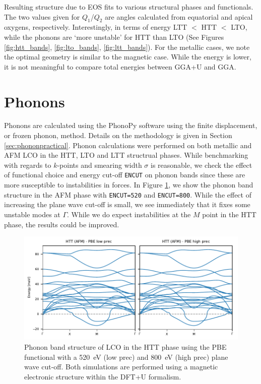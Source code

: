 \begin{table}
	\centering
	\caption[Simulation Structure Results]{Resulting structure due to EOS fits to various structural phases and functionals. The two values given for $Q_1$/$Q_2$ are angles calculated from equatorial and apical oxygens, respectively. Interestingly, in terms of energy LTT $<$ HTT $<$ LTO, while the phonons are `more unstable' for HTT than LTO (See Figures \ref{fig:htt_bands}, \ref{fig:lto_bands}, \ref{fig:ltt_bands}). For the metallic cases, we note the optimal geometry is similar to the magnetic case. While the energy is lower, it is not meaningful to compare total energies between GGA+U and GGA.}
    \label{tab:sim_struct}
    
\end{table}

\section{Phonons}
Phonons are calculated using the PhonoPy software using the finite displacement, or frozen phonon, method. Details on the methodology is given in Section \ref{sec:phononpractical}. Phonon calculations were performed on both metallic and AFM LCO in the HTT, LTO and LTT structrual phases. While benchmarking with regards to $k$-points and smearing width $\sigma$ is reasonable, we check the effect of functional choice and energy cut-off \texttt{ENCUT} on phonon bands since these are more susceptible to instabilities in forces. In Figure \ref{fig:pbe_bands}, we show the phonon band structure in the AFM phase with \texttt{ENCUT=520} and \texttt{ENCUT=800}. While the effect of increasing the plane wave cut-off is small, we see immediately that it fixes some unstable modes at $\Gamma$. While we do expect instabilities at the $M$ point in the HTT phase, the results could be improved.

\begin{figure}
	\centering
	\includegraphics[width=\textwidth]{fig/simulation/htt_pbe_bands.pdf}
	\caption[PBE Bands: Comparison wrt ENCUT]{Phonon band structure of LCO in the HTT phase using the PBE functional with a \SI{520}{\eV} (low prec) and \SI{800}{\eV} (high prec) plane wave cut-off. Both simulations are performed using a magnetic electronic structure within the DFT+U formalism.}  
	\label{fig:pbe_bands}
\end{figure}

